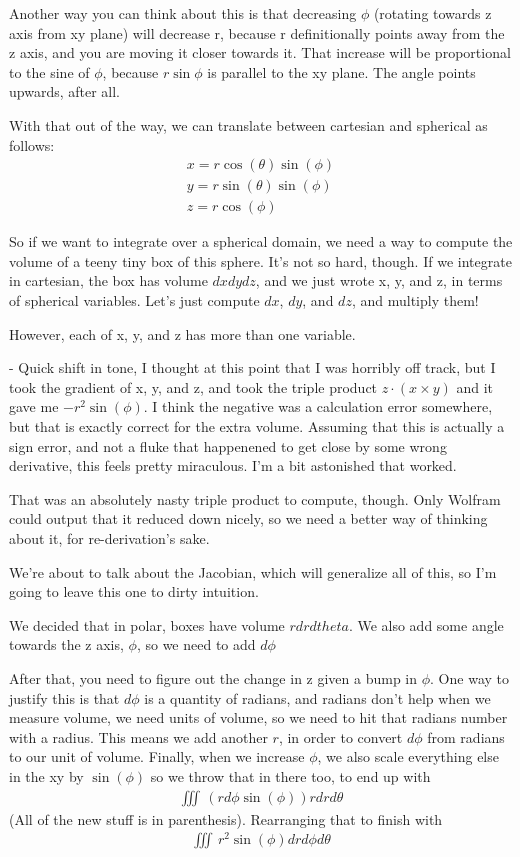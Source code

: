 \documentclass[12pt, letterpaper]{article}
\begin{document}
Another way you can think about this is that decreasing $\phi$ (rotating towards z axis from xy plane)
will decrease r, because r definitionally points away from the z axis, and you are moving it closer towards it.
That increase will be proportional to the sine of $\phi$, because $r\sin\phi$ is parallel to the xy plane.
The angle points upwards, after all.

With that out of the way, we can translate between cartesian and spherical as follows:
\begin{gather*}
    x = r\cos(\theta)\sin(\phi)\\
    y = r\sin(\theta)\sin(\phi)\\
    z = r\cos(\phi)
\end{gather*}

So if we want to integrate over a spherical domain, we need a way to compute the volume of a teeny tiny box of this sphere.
It's not so hard, though.
If we integrate in cartesian, the box has volume $dxdydz$, and we just wrote x, y, and z, in terms of spherical variables.
Let's just compute $dx$, $dy$, and $dz$, and multiply them!

However, each of x, y, and z has more than one variable.

- Quick shift in tone, I thought at this point that I was horribly off track, but
I took the gradient of x, y, and z, and took the triple product $z \cdot (x \times y)$ and it gave me $-r^2 \sin(\phi)$.
I think the negative was a calculation error somewhere, but that is exactly correct for the extra volume.
Assuming that this is actually a sign error, and not a fluke that happenened to get close by some wrong derivative, this feels pretty miraculous.
I'm a bit astonished that worked.

That was an absolutely nasty triple product to compute, though.
Only Wolfram could output that it reduced down nicely, so we need a better way of thinking about it, for re-derivation's sake.

We're about to talk about the Jacobian, which will generalize all of this, so I'm going to leave this one to dirty intuition.

We decided that in polar, boxes have volume $rdrdtheta$.
We also add some angle towards the z axis, $\phi$, so we need to add $d\phi$

After that, you need to figure out the change in z given a bump in $\phi$.
One way to justify this is that $d\phi$ is a quantity of radians, and radians don't help when we measure volume, we need units of volume, so we need to hit that radians number with a radius.
This means we add another $r$, in order to convert $d\phi$ from radians to our unit of volume.
Finally, when we increase $\phi$, we also scale everything else in the xy by $\sin(\phi)$ so we throw that in there too, to end up with
\begin{gather*}
    \iiint\, (rd\phi \sin(\phi)) rdrd\theta
\end{gather*} 
(All of the new stuff is in parenthesis).
Rearranging that to finish with
\begin{gather*}
    \iiint\, r^2 \sin(\phi) dr d\phi d\theta
\end{gather*}
\end{document}
